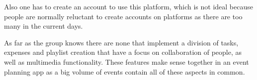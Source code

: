 
Also one has to create an account to use this platform, which is not ideal because people are normally reluctant to create accounts on platforms as there are too many in the current days. 


As far as the group knows there are none that implement a division of tasks, expenses and playlist creation that have a focus on collaboration of people, as well as multimedia functionality. These features make sense together in an event planning app as a big volume of events contain all of these aspects in common.